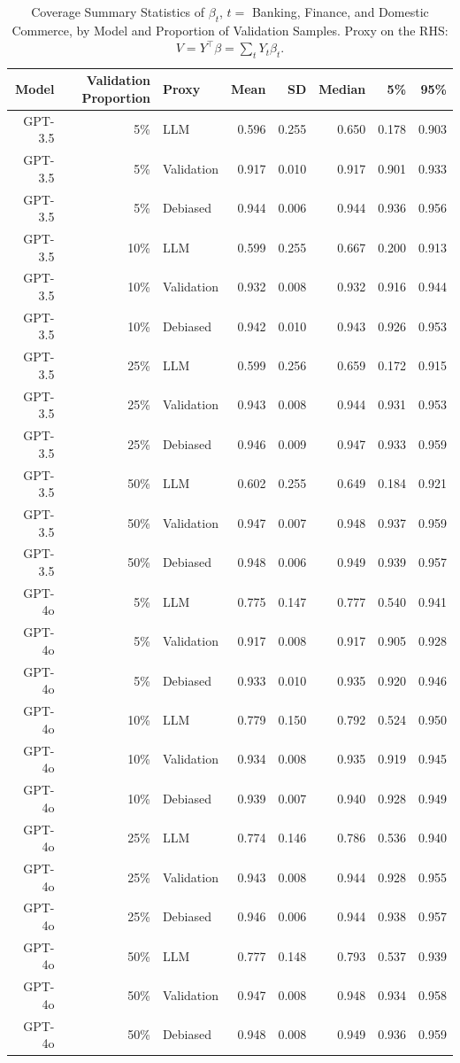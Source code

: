 \begin{table}

\caption{Coverage Summary Statistics of $\beta_{t}$, $t=$ Banking, Finance, and Domestic Commerce, by Model and Proportion of Validation Samples. Proxy on the RHS: $V = Y^\top \beta = \sum_{t} Y_t \beta_t$.}
\centering
\begin{tabular}[t]{rrlrrrrr}
\toprule
Model & Validation Proportion & Proxy & Mean & SD & Median & 5\% & 95\%\\
\midrule
GPT-3.5 & 5\% & LLM & 0.596 & 0.255 & 0.650 & 0.178 & 0.903\\
GPT-3.5 & 5\% & Validation & 0.917 & 0.010 & 0.917 & 0.901 & 0.933\\
GPT-3.5 & 5\% & Debiased & 0.944 & 0.006 & 0.944 & 0.936 & 0.956\\
GPT-3.5 & 10\% & LLM & 0.599 & 0.255 & 0.667 & 0.200 & 0.913\\
GPT-3.5 & 10\% & Validation & 0.932 & 0.008 & 0.932 & 0.916 & 0.944\\
GPT-3.5 & 10\% & Debiased & 0.942 & 0.010 & 0.943 & 0.926 & 0.953\\
GPT-3.5 & 25\% & LLM & 0.599 & 0.256 & 0.659 & 0.172 & 0.915\\
GPT-3.5 & 25\% & Validation & 0.943 & 0.008 & 0.944 & 0.931 & 0.953\\
GPT-3.5 & 25\% & Debiased & 0.946 & 0.009 & 0.947 & 0.933 & 0.959\\
GPT-3.5 & 50\% & LLM & 0.602 & 0.255 & 0.649 & 0.184 & 0.921\\
GPT-3.5 & 50\% & Validation & 0.947 & 0.007 & 0.948 & 0.937 & 0.959\\
GPT-3.5 & 50\% & Debiased & 0.948 & 0.006 & 0.949 & 0.939 & 0.957\\
GPT-4o & 5\% & LLM & 0.775 & 0.147 & 0.777 & 0.540 & 0.941\\
GPT-4o & 5\% & Validation & 0.917 & 0.008 & 0.917 & 0.905 & 0.928\\
GPT-4o & 5\% & Debiased & 0.933 & 0.010 & 0.935 & 0.920 & 0.946\\
GPT-4o & 10\% & LLM & 0.779 & 0.150 & 0.792 & 0.524 & 0.950\\
GPT-4o & 10\% & Validation & 0.934 & 0.008 & 0.935 & 0.919 & 0.945\\
GPT-4o & 10\% & Debiased & 0.939 & 0.007 & 0.940 & 0.928 & 0.949\\
GPT-4o & 25\% & LLM & 0.774 & 0.146 & 0.786 & 0.536 & 0.940\\
GPT-4o & 25\% & Validation & 0.943 & 0.008 & 0.944 & 0.928 & 0.955\\
GPT-4o & 25\% & Debiased & 0.946 & 0.006 & 0.944 & 0.938 & 0.957\\
GPT-4o & 50\% & LLM & 0.777 & 0.148 & 0.793 & 0.537 & 0.939\\
GPT-4o & 50\% & Validation & 0.947 & 0.008 & 0.948 & 0.934 & 0.958\\
GPT-4o & 50\% & Debiased & 0.948 & 0.008 & 0.949 & 0.936 & 0.959\\
\bottomrule
\end{tabular}
\end{table}
